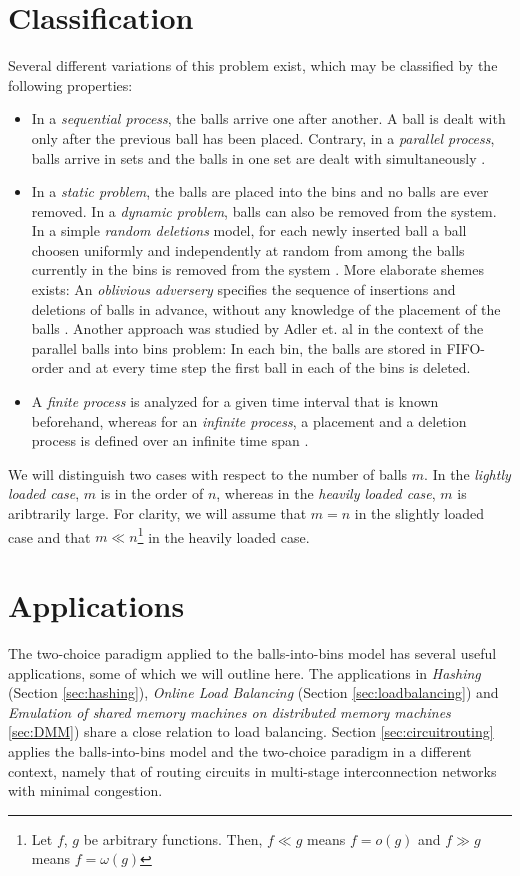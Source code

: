 \documentclass{acm_proc_article-sp}
\begin{document}
\section{Classification}
\label{sec:classification}
Several different variations of this problem exist, which may be classified by the following properties:
\begin{itemize}
\item In a \emph{sequential process}, the balls arrive one after another. A  ball is dealt with only after the previous ball has been placed. Contrary, in a \emph{parallel process}, balls arrive in sets and the balls in one set are dealt with simultaneously \cite{ABS98}. 
\item In a \emph{static problem}, the balls are placed into the bins and no balls are ever removed. In a \emph{dynamic problem}, balls can also be removed from the system. In a simple \emph{random deletions} model, for each newly inserted ball a ball choosen uniformly and independently at random from among the balls currently in the bins is removed from the system \cite{ABKU99} \cite{MRS01}. More elaborate shemes exists: An \emph{oblivious adversery} specifies the sequence of insertions and deletions of balls in advance, without any knowledge of the placement of the balls \cite{CFM+98}. Another approach was studied by Adler et. al \cite{ABS98} in the context of the parallel balls into bins problem: In each bin, the balls are stored in FIFO-order and at every time step the first ball in each of the bins is deleted. 
\item A \emph{finite process} is analyzed for a given time interval that is known beforehand, whereas for an \emph{infinite process}, a placement and a deletion process is defined over an infinite time span \cite{ABS98}.
\end{itemize}

We will distinguish two cases with respect to the number of balls $m$. In the \emph{lightly loaded case}, $m$ is in the order of $n$, whereas in the \emph{heavily loaded case}, $m$ is aribtrarily large. For clarity, we will assume that $m = n$ in the slightly loaded case and that $m \ll n$\footnote{Let $f$, $g$ be arbitrary functions. Then, $f \ll g$ means $f = o(g)$ and $ f \gg g$ means $f = \omega(g)$} in the heavily loaded case. 

\section{Applications}
\label{sec:applications}
The two-choice paradigm applied to the balls-into-bins model has several useful applications, some of which we will outline here. The applications in \emph{Hashing} (Section \ref{sec:hashing}), \emph{Online Load Balancing} (Section \ref{sec:loadbalancing}) and \emph{Emulation of shared memory machines on distributed memory machines} \ref{sec:DMM}) share a close relation to load balancing. Section \ref{sec:circuitrouting} applies the balls-into-bins model and the two-choice paradigm in a different context, namely that of routing circuits in multi-stage interconnection networks with minimal congestion.
\end{document}
